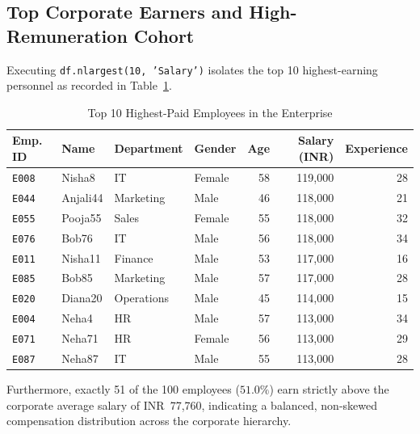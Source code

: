 \subsection{Top Corporate Earners and High-Remuneration Cohort}
Executing \texttt{df.nlargest(10, 'Salary')} isolates the top 10 highest-earning personnel as recorded in Table~\ref{tab:exp1_top10}.
\begin{table}[H]
\centering
\small
\caption{Top 10 Highest-Paid Employees in the Enterprise}
\label{tab:exp1_top10}
\begin{tabular}{llllrrr}
\toprule
\textbf{Emp. ID} & \textbf{Name} & \textbf{Department} & \textbf{Gender} & \textbf{Age} & \textbf{Salary (INR)} & \textbf{Experience} \\
\midrule
\texttt{E008} & Nisha8 & IT & Female & 58 & 119,000 & 28 \\
\texttt{E044} & Anjali44 & Marketing & Male & 46 & 118,000 & 21 \\
\texttt{E055} & Pooja55 & Sales & Female & 55 & 118,000 & 32 \\
\texttt{E076} & Bob76 & IT & Male & 56 & 118,000 & 34 \\
\texttt{E011} & Nisha11 & Finance & Male & 53 & 117,000 & 16 \\
\texttt{E085} & Bob85 & Marketing & Male & 57 & 117,000 & 28 \\
\texttt{E020} & Diana20 & Operations & Male & 45 & 114,000 & 15 \\
\texttt{E004} & Neha4 & HR & Male & 57 & 113,000 & 34 \\
\texttt{E071} & Neha71 & HR & Female & 56 & 113,000 & 29 \\
\texttt{E087} & Neha87 & IT & Male & 55 & 113,000 & 28 \\
\bottomrule
\end{tabular}
\end{table}

Furthermore, exactly 51 of the 100 employees ($51.0\%$) earn strictly above the corporate average salary of INR~77,760, indicating a balanced, non-skewed compensation distribution across the corporate hierarchy.

